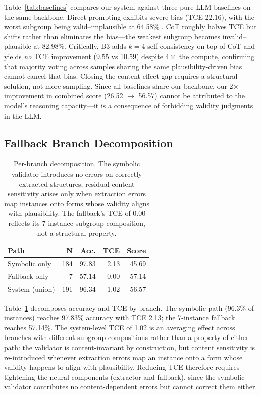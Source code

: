 \documentclass[11pt]{article}
\begin{document}
Table~\ref{tab:baselines} compares our system against three pure-LLM baselines on the same backbone. Direct prompting exhibits severe bias (TCE 22.16), with the worst subgroup being valid--implausible at 64.58\% \citep{dasgupta2022language, eisape2024systematic}. CoT roughly halves TCE but shifts rather than eliminates the bias---the weakest subgroup becomes invalid--plausible at 82.98\%. Critically, B3 adds $k=4$ self-consistency on top of CoT and yields \emph{no} TCE improvement (9.55 vs 10.59) despite $4\times$ the compute, confirming that majority voting across samples sharing the same plausibility-driven bias cannot cancel that bias. Closing the content-effect gap requires a structural solution, not more sampling. Since all baselines share our backbone, our 2$\times$ improvement in combined score (26.52 $\to$ 56.57) cannot be attributed to the model's reasoning capacity---it is a consequence of forbidding validity judgments in the LLM.

\subsection{Fallback Branch Decomposition}
\label{sec:fallback}

\begin{table}[t]
\centering
\small
\setlength{\tabcolsep}{4pt}
\begin{tabular}{@{}lrrrr@{}}
\toprule
\textbf{Path} & \textbf{N} & \textbf{Acc.} & \textbf{TCE} & \textbf{Score} \\
\midrule
Symbolic only  & 184 & 97.83 & 2.13 & 45.69 \\
Fallback only  & 7   & 57.14 & 0.00 & 57.14 \\
System (union) & 191 & 96.34 & 1.02 & 56.57 \\
\bottomrule
\end{tabular}
\caption{Per-branch decomposition. The symbolic validator introduces no errors on correctly extracted structures; residual content sensitivity arises only when extraction errors map instances onto forms whose validity aligns with plausibility. The fallback's TCE of 0.00 reflects its 7-instance subgroup composition, not a structural property.}
\label{tab:fallback}
\end{table}

Table~\ref{tab:fallback} decomposes accuracy and TCE by branch. The symbolic path (96.3\% of instances) reaches 97.83\% accuracy with TCE 2.13; the 7-instance fallback reaches 57.14\%. The system-level TCE of 1.02 is an averaging effect across branches with different subgroup compositions rather than a property of either path: the validator is content-invariant by construction, but content sensitivity is re-introduced whenever extraction errors map an instance onto a form whose validity happens to align with plausibility. Reducing TCE therefore requires tightening the neural components (extractor and fallback), since the symbolic validator contributes no content-dependent errors but cannot correct them either.
\end{document}
